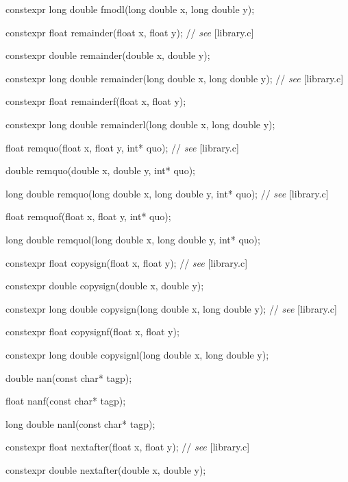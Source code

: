 \documentclass[prd,twocolumn,amsmath,amssymb,nofootinbib,eqsecnum]{revtex4-1}
\newcommand{\highlight}[1]{{\color{red} #1}}
\newcommand{\stdcomment}[1]{{// {\em see} [#1]}}
\begin{document}
{\highlight{constexpr} long double fmodl(long double x, long double y);

\vspace{2ex}

\highlight{constexpr} float remainder(float x, float y); \stdcomment{library.c}

\highlight{constexpr} double remainder(double x, double y);

\highlight{constexpr} long double remainder(long double x, long double y); \stdcomment{library.c}

\highlight{constexpr} float remainderf(float x, float y);

\highlight{constexpr} long double remainderl(long double x, long double y);

\vspace{2ex}

float remquo(float x, float y, int* quo); \stdcomment{library.c}

double remquo(double x, double y, int* quo);

long double remquo(long double x, long double y, int* quo); \stdcomment{library.c}

float remquof(float x, float y, int* quo);

long double remquol(long double x, long double y, int* quo);

\vspace{2ex}

\highlight{constexpr} float copysign(float x, float y); \stdcomment{library.c}

\highlight{constexpr} double copysign(double x, double y);

\highlight{constexpr} long double copysign(long double x, long double y); \stdcomment{library.c}

\highlight{constexpr} float copysignf(float x, float y);

\highlight{constexpr} long double copysignl(long double x, long double y);

\vspace{2ex}

double nan(const char* tagp);

float nanf(const char* tagp);

long double nanl(const char* tagp);

\vspace{2ex}

\highlight{constexpr}  float nextafter(float x, float y); \stdcomment{library.c}

\highlight{constexpr}  double nextafter(double x, double y);

}
\end{document}
